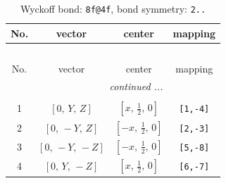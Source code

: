 \documentclass[fleqn,8pt]{jsarticle}
\begin{document}
\renewcommand{\arraystretch}{1.2}
\begin{longtable}{cccc}
\caption{Wyckoff bond: {\tt 8f@4f}, bond symmetry: {\tt 2..}}
 \\
 \hline \hline
No. & vector & center & mapping \\ \hline \endfirsthead

\multicolumn{3}{l}{\tablename\ \thetable{}} \\
 \hline \hline
No. & vector & center & mapping \\ \hline \endhead

 \hline \hline
\multicolumn{3}{r}{\footnotesize\it continued ...} \\ \endfoot

 \hline \hline
\multicolumn{3}{r}{} \\ \endlastfoot

1 & $\left[ 0,\, Y,\, Z \right]$ & $\left[ x,\, \frac{1}{2},\, 0 \right]$ & {\tt [1,-4]} \\ \hline
2 & $\left[ 0,\, - Y,\, Z \right]$ & $\left[ - x,\, \frac{1}{2},\, 0 \right]$ & {\tt [2,-3]} \\ \hline
3 & $\left[ 0,\, - Y,\, - Z \right]$ & $\left[ - x,\, \frac{1}{2},\, 0 \right]$ & {\tt [5,-8]} \\ \hline
4 & $\left[ 0,\, Y,\, - Z \right]$ & $\left[ x,\, \frac{1}{2},\, 0 \right]$ & {\tt [6,-7]} \\
\end{longtable}
\renewcommand{\arraystretch}{1.2}
\end{document}
